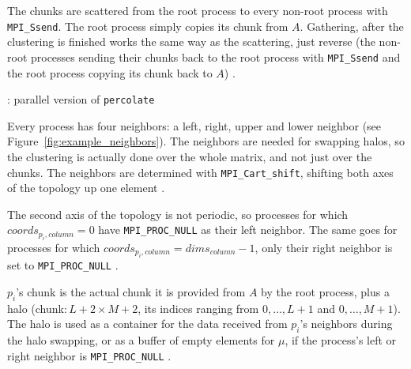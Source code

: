 \documentclass[twoside,11pt]{article}
\def\perc{\texttt{perco\-late}}
\begin{document}
The chunks are scattered from the root process to every
non-root process with \texttt{MPI\_S\-send}.
The root process simply copies its chunk from $A$.
Gathering, after the clustering is finished works the same
way as the scattering, just reverse (the non-root processes
sending their chunks back to the root process with
\texttt{MPI\_Ssend} and the root process copying its chunk
back to $A$) \citep[see Algorithm~\ref{alg:perc_par},
lines 5,7 and][Chapter 3]{mpi}.

\begin{algorithm} %
  \caption{: parallel version of \perc{}}
  \label{alg:perc_par}

  \begin{algorithmic}[1]
    \ENDIF
    \ENDIF

  \end{algorithmic}
\end{algorithm} %

Every process has four neighbors: a left, right, upper and
lower neighbor (see Figure~\ref{fig:example_neighbors}).
The neighbors are needed for swapping halos, so the
clustering is actually done over the whole matrix, and not
just over the chunks.
The neighbors are determined with
\texttt{MPI\_Cart\_shift}, shifting both axes of the
topology up one element \citep[see][Chapter 7]{mpi}.

The second axis of the topology is not periodic, so
processes for which $coords_{p_i, column} = 0$ have
\texttt{MPI\_PROC\_NULL} as their left neighbor.
The same goes for processes for which
$coords_{p_i, column} = dims_{column} - 1$, only their
right neighbor is set to \texttt{MPI\_PROC\_NULL}
\citep[see Figure~\ref{fig:example_neighbors} and]
[Chapter 3]{mpi}.

$p_i$'s chunk is the actual chunk it is provided from $A$
by the root process, plus a halo (chunk$: L+2 \times M+2$,
its indices ranging from $0,\dots,L+1$ and $0,\dots,M+1$).
The halo is used as a container for the data received from
$p_i$'s neighbors during the halo swapping, or as a buffer
of empty elements for $\mu$, if the process's left or right
neighbor is \texttt{MPI\_PROC\_NULL}
\citep[see][Chapter 3]{mpi}.
\end{document}
